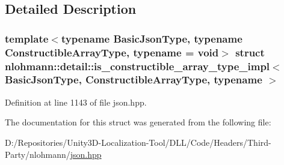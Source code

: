 \subsection{Detailed Description}
\subsubsection*{template$<$typename Basic\+Json\+Type, typename Constructible\+Array\+Type, typename = void$>$\newline
struct nlohmann\+::detail\+::is\+\_\+constructible\+\_\+array\+\_\+type\+\_\+impl$<$ Basic\+Json\+Type, Constructible\+Array\+Type, typename $>$}



Definition at line 1143 of file json.\+hpp.



The documentation for this struct was generated from the following file\+:\begin{DoxyCompactItemize}
\item 
D\+:/\+Repositories/\+Unity3\+D-\/\+Localization-\/\+Tool/\+D\+L\+L/\+Code/\+Headers/\+Third-\/\+Party/nlohmann/\mbox{\hyperlink{json_8hpp}{json.\+hpp}}\end{DoxyCompactItemize}
